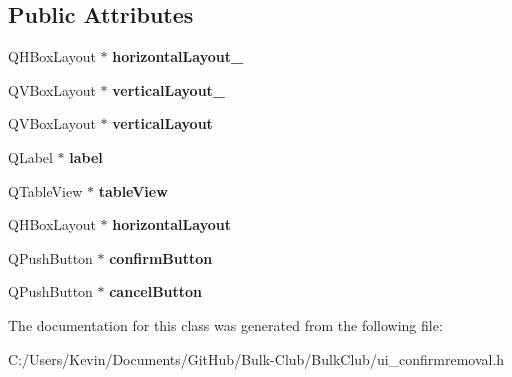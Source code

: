 \subsection*{Public Attributes}
\begin{DoxyCompactItemize}
\item 
\mbox{\label{class_ui___confirm_removal_aeabf11b431bc31a9fa7293c004803a30}} 
Q\+H\+Box\+Layout $\ast$ {\bfseries horizontal\+Layout\+\_}
\item 
\mbox{\label{class_ui___confirm_removal_a0eed25fbd88b25b995d00db39c19fc03}} 
Q\+V\+Box\+Layout $\ast$ {\bfseries vertical\+Layout\+\_}
\item 
\mbox{\label{class_ui___confirm_removal_adcfc71589b55b2422a363673ac98a58c}} 
Q\+V\+Box\+Layout $\ast$ {\bfseries vertical\+Layout}
\item 
\mbox{\label{class_ui___confirm_removal_a7c6fece30af582d8e31b8e891b94af43}} 
Q\+Label $\ast$ {\bfseries label}
\item 
\mbox{\label{class_ui___confirm_removal_a9ba6d9a3c8fa9cc5284beb8590109a30}} 
Q\+Table\+View $\ast$ {\bfseries table\+View}
\item 
\mbox{\label{class_ui___confirm_removal_a8b1c95af6b617447a58afb4188b0c9ee}} 
Q\+H\+Box\+Layout $\ast$ {\bfseries horizontal\+Layout}
\item 
\mbox{\label{class_ui___confirm_removal_ab91924afbc2dad8eab5b827d7ba15eab}} 
Q\+Push\+Button $\ast$ {\bfseries confirm\+Button}
\item 
\mbox{\label{class_ui___confirm_removal_a9ad1a10c8cb30128030e7c2eebaa5d33}} 
Q\+Push\+Button $\ast$ {\bfseries cancel\+Button}
\end{DoxyCompactItemize}


The documentation for this class was generated from the following file\+:\begin{DoxyCompactItemize}
\item 
C\+:/\+Users/\+Kevin/\+Documents/\+Git\+Hub/\+Bulk-\/\+Club/\+Bulk\+Club/ui\+\_\+confirmremoval.\+h\end{DoxyCompactItemize}
